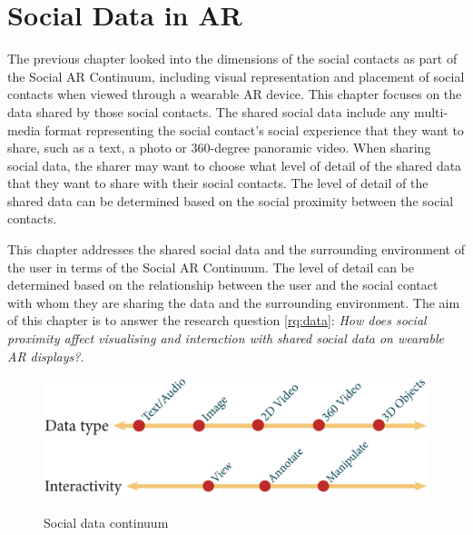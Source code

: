 \chapter{Social Data in AR} 
\label{ch:data} 


The previous chapter looked into the dimensions of the social contacts as part of the Social AR Continuum, including visual representation and placement of social contacts when viewed through a wearable AR device. This chapter focuses on the data shared by those social contacts. The shared social data include any multi-media format representing the social contact's social experience that they want to share, such as a text, a photo or 360-degree panoramic video. When sharing social data, the sharer may want to choose what level of detail of the shared data that they want to share with their social contacts. The level of detail of the shared data can be determined based on the social proximity between the social contacts. 

This chapter addresses the shared social data and the surrounding environment of the user in terms of the Social AR Continuum. The level of detail can be determined based on the relationship between the user and the social contact with whom they are sharing the data and the surrounding environment. The aim of this chapter is to answer the research question \ref{rq:data}: \textit{How does social proximity affect visualising and interaction with shared social data on wearable AR displays?}. 


\begin{figure}[ht]
  \centering
  \includegraphics[width=\columnwidth]{images/30-continuum/continuum4_2-03.eps}
  \includegraphics[width=\columnwidth]{images/30-continuum/continuum4_2-04.eps}
  \caption{Social data continuum}
  \label{fig:surrounding:data-continuum}
\end{figure}

